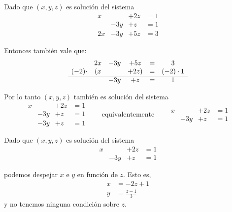 \documentclass[handout]{beamer} %
\renewcommand{\_}[1]{_{\left( #1 \right)}}
\renewcommand{\^}[1]{^{\left( #1 \right)}}
\begin{document}
\begin{frame}

Dado que $(x,y,z)$ es solución del sistema
\begin{equation*}
\begin{matrix}
x &  & +2z & = 1 \\
& -3y & +z & = 1   \\
2x& -3y & +5z & =3
\end{matrix}
\end{equation*}



Entonces también vale que: 
\begin{equation*}
\begin{matrix}
&2x& -3y & +5z & = &3 \\
(-2)\cdot&(x &  & +2z) & = &(-2)\cdot1 \\
\hline
& & -3y & + z & = & 1  
\end{matrix}
\end{equation*}

 \pause
 
Por lo tanto $(x,y,z)$ también es solución del sistema
\begin{equation*}
\begin{matrix}
x &  & +2z & = 1 \\
& -3y & +z & = 1   \\
& -3y & +z & = 1
\end{matrix}
\qquad\mbox{equivalentemente}\qquad
\begin{matrix}
x &  & +2z & = 1 \\
& -3y & +z & = 1 
\end{matrix}
\end{equation*}
\end{frame}


\begin{frame}
Dado que $(x,y,z)$ es solución del sistema 
\begin{equation*}
\begin{matrix}
x &  & +2z & = 1 \\
& -3y & +z & = 1 
\end{matrix}
\end{equation*}
 
podemos despejar $x$ e $y$ en función de $z$.  \pause Esto es,
\begin{align*}
x&=-2z+1\\
y&=\frac{z-1}{3}
\end{align*}
y no tenemos ninguna condición sobre $z$.
\end{frame}
\end{document}
